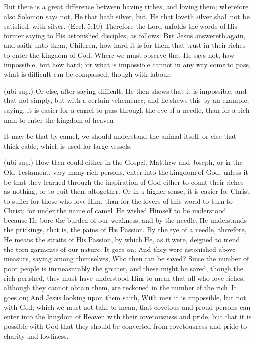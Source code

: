  But there is a great difference between having riches, and loving them; wherefore also Solomon says not, He that hath silver, but, He that loveth silver shall not be satisfied, with silver. (Eccl. 5:10) Therefore the Lord unfolds the words of His former saying to His astonished disciples, as follows: But Jesus answereth again, and saith unto them, Children, how hard it is for them that trust in their riches to enter the kingdom of God. Where we must observe that He says not, how impossible, but how hard; for what is impossible cannot in any way come to pass, what is difficult can be compassed, though with labour.

 (ubi sup.) Or else, after saying difficult, He then shews that it is impossible, and that not simply, but with a certain vehemence; and he shews this by an example, saying, It is easier for a camel to pass through the eye of a needle, than for a rich man to enter the kingdom of heaven.

 It may be that by camel, we should understand the animal itself, or else that thick cable, which is used for large vessels.

 (ubi sup.) How then could either in the Gospel, Matthew and Joseph, or in the Old Testament, very many rich persons, enter into the kingdom of God, unless it be that they learned through the inspiration of God either to count their riches as nothing, or to quit them altogether. Or in a higher sense, it is easier for Christ to suffer for those who love Him, than for the lovers of this world to turn to Christ; for under the name of camel, He wished Himself to be understood, because He bore the burden of our weakness; and by the needle, He understands the prickings, that is, the pains of His Passion. By the eye of a needle, therefore, He means the straits of His Passion, by which He, as it were, deigned to mend the torn garments of our nature. It goes on; And they were astonished above measure, saying among themselves, Who then can be saved? Since the number of poor people is immeasurably the greater, and these might be saved, though the rich perished, they must have understood Him to mean that all who love riches, although they cannot obtain them, are reckoned in the number of the rich. It goes on; And Jesus looking upon them saith, With men it is impossible, but not with God; which we must not take to mean, that covetous and proud persons can enter into the kingdom of Heaven with their covetousness and pride, but that it is possible with God that they should be converted from covetousness and pride to charity and lowliness.

